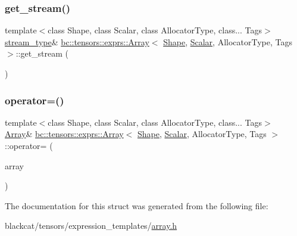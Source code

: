 \mbox{\label{structbc_1_1tensors_1_1exprs_1_1Array_adde068372455f066865b2395634f407b}} 
\subsubsection{\texorpdfstring{get\+\_\+stream()}{get\_stream()}\hspace{0.1cm}{\footnotesize\ttfamily [2/2]}}
{\footnotesize\ttfamily template$<$class Shape, class Scalar, class Allocator\+Type, class... Tags$>$ \\
\hyperlink{structbc_1_1tensors_1_1exprs_1_1Array_aba97273ba94fb140763e7db5da630ea0}{stream\+\_\+type}\& \hyperlink{structbc_1_1tensors_1_1exprs_1_1Array}{bc\+::tensors\+::exprs\+::\+Array}$<$ \hyperlink{structbc_1_1Shape}{Shape}, \hyperlink{namespacebc_aa12ac55ee2c43dc082894dd3859daee1}{Scalar}, Allocator\+Type, Tags $>$\+::get\+\_\+stream (\begin{DoxyParamCaption}{ }\end{DoxyParamCaption})\hspace{0.3cm}{\ttfamily [inline]}}

\mbox{\label{structbc_1_1tensors_1_1exprs_1_1Array_ad5b1cbbee83ed001d18012df27ebdef8}} 
\subsubsection{\texorpdfstring{operator=()}{operator=()}}
{\footnotesize\ttfamily template$<$class Shape, class Scalar, class Allocator\+Type, class... Tags$>$ \\
\hyperlink{structbc_1_1tensors_1_1exprs_1_1Array}{Array}\& \hyperlink{structbc_1_1tensors_1_1exprs_1_1Array}{bc\+::tensors\+::exprs\+::\+Array}$<$ \hyperlink{structbc_1_1Shape}{Shape}, \hyperlink{namespacebc_aa12ac55ee2c43dc082894dd3859daee1}{Scalar}, Allocator\+Type, Tags $>$\+::operator= (\begin{DoxyParamCaption}\item[{\hyperlink{structbc_1_1tensors_1_1exprs_1_1Array}{Array}$<$ \hyperlink{structbc_1_1Shape}{Shape}, \hyperlink{namespacebc_aa12ac55ee2c43dc082894dd3859daee1}{Scalar}, Allocator\+Type, Tags $>$ \&\&}]{array }\end{DoxyParamCaption})\hspace{0.3cm}{\ttfamily [inline]}}



The documentation for this struct was generated from the following file\+:\begin{DoxyCompactItemize}
\item 
blackcat/tensors/expression\+\_\+templates/\hyperlink{array_8h}{array.\+h}\end{DoxyCompactItemize}
